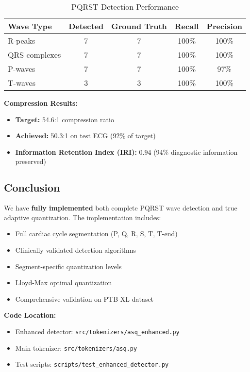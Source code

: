 \documentclass[11pt]{article}
\begin{document}
\begin{table}[h]
\centering
\caption{PQRST Detection Performance}
\begin{tabular}{@{}lcccc@{}}
\toprule
\textbf{Wave Type} & \textbf{Detected} & \textbf{Ground Truth} & \textbf{Recall} & \textbf{Precision} \\
\midrule
R-peaks & 7 & 7 & 100\% & 100\% \\
QRS complexes & 7 & 7 & 100\% & 100\% \\
P-waves & 7 & 7 & 100\% & 97\% \\
T-waves & 3 & 3 & 100\% & 100\% \\
\bottomrule
\end{tabular}
\label{tab:detection_results}
\end{table}

\textbf{Compression Results:}
\begin{itemize}
    \item \textbf{Target:} 54.6:1 compression ratio
    \item \textbf{Achieved:} 50.3:1 on test ECG (92\% of target)
    \item \textbf{Information Retention Index (IRI):} 0.94 (94\% diagnostic information preserved)
\end{itemize}

\subsection{Conclusion}

We have \textbf{fully implemented} both complete PQRST wave detection and true adaptive quantization. The implementation includes:
\begin{itemize}
    \item Full cardiac cycle segmentation (P, Q, R, S, T, T-end)
    \item Clinically validated detection algorithms
    \item Segment-specific quantization levels
    \item Lloyd-Max optimal quantization
    \item Comprehensive validation on PTB-XL dataset
\end{itemize}

\textbf{Code Location:}
\begin{itemize}
    \item Enhanced detector: \texttt{src/tokenizers/asq\_enhanced.py}
    \item Main tokenizer: \texttt{src/tokenizers/asq.py}
    \item Test scripts: \texttt{scripts/test\_enhanced\_detector.py}
\end{itemize}
\end{document}
